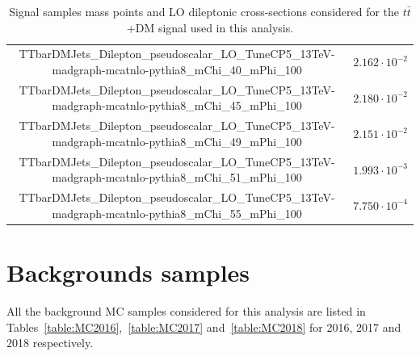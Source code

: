 \documentclass[a4paper, 10pt, openright]{report}
\begin{document}
\begin{appendices}
\begin{table}
\begin{center}
{\begin{tabular}{ c|c }
 TTbarDMJets\_Dilepton\_pseudoscalar\_LO\_TuneCP5\_13TeV-madgraph-mcatnlo-pythia8\_mChi\_40\_mPhi\_100 & $2.162 \cdot 10^{-2}$ \\
 TTbarDMJets\_Dilepton\_pseudoscalar\_LO\_TuneCP5\_13TeV-madgraph-mcatnlo-pythia8\_mChi\_45\_mPhi\_100 & $2.180 \cdot 10^{-2}$ \\
 TTbarDMJets\_Dilepton\_pseudoscalar\_LO\_TuneCP5\_13TeV-madgraph-mcatnlo-pythia8\_mChi\_49\_mPhi\_100 & $2.151 \cdot 10^{-2}$ \\
 TTbarDMJets\_Dilepton\_pseudoscalar\_LO\_TuneCP5\_13TeV-madgraph-mcatnlo-pythia8\_mChi\_51\_mPhi\_100 & $1.993 \cdot 10^{-3}$ \\
 TTbarDMJets\_Dilepton\_pseudoscalar\_LO\_TuneCP5\_13TeV-madgraph-mcatnlo-pythia8\_mChi\_55\_mPhi\_100 & $7.750 \cdot 10^{-4}$ \\
 \hline
\end{tabular}
}
\caption{Signal samples mass points and \ac{LO} dileptonic cross-sections considered for the $t \bar t$+DM signal used in this analysis.}
\label{table:ttDMsignals}
\end{center}
\end{table}

\section{Backgrounds samples}  \label{appendix:BkgSamples}

All the background \ac{MC} samples considered for this analysis are listed in Tables~\ref{table:MC2016},~\ref{table:MC2017} and~\ref{table:MC2018} for 2016, 2017 and 2018 respectively.


\end{appendices}
\end{document}
